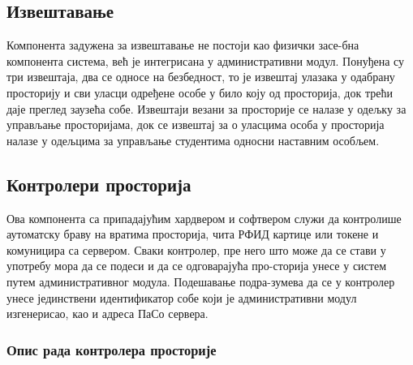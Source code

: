 \documentclass[a4paper, 12pt, diplomski]{etfcyr}
\begin{document}
			\subsection{Извештавање}
				\begin{justify}
					Компонента задужена за извештавање не постоји као физички засе-бна компонента система, већ је интегрисана у административни модул. Понуђена су три извештаја, два се односе на безбедност, то је извештај улазака у одабрану просторију и сви уласци одређене особе у било коју од просторија, док трећи даје преглед заузећа собе. Извештаји везани за просторије се налазе у одељку за управљање просторијама, док се извештај за о уласцима особа у просторија налазе у одељцима за управљање студентима односни наставним особљем.
				\end{justify}

			\subsection{Контролери просторија}
				\begin{justify}
					Ова компонента са припадајућим хардвером и софтвером служи да контролише аутоматску браву на вратима просторија, чита РФИД картице или токене и комуницира са сервером.
					Сваки контролер, пре него што може да се стави у употребу мора да се подеси и да се одговарајућа про-сторија унесе у систем путем административног модула. Подешавање подра-зумева да се у контролер унесе јединствени идентификатор собе који је административни модул изгенерисао, као и адреса ПаСо сервера.
				\end{justify}

				\newpage

				\subsubsection*{Опис рада контролера просторије}
\end{document}
